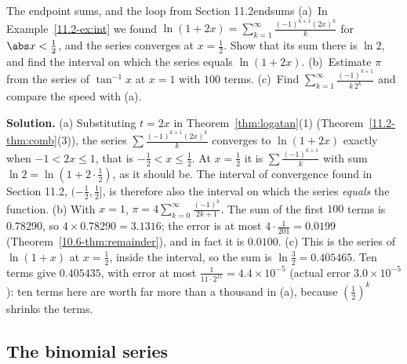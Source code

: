 \documentclass[11pt]{article}
\begin{document}
\begin{exmp}{The endpoint sums, and the loop from Section 11.2}{endsums}
(a)~In Example~\ref{11.2-ex:int} we found $\ln(1+2x)=\sum_{k=1}^\infty\frac{(-1)^{k+1}(2x)^k}k$ for $\abs x<\frac12$, and the series converges at $x=\frac12$. Show that its sum there is $\ln2$, and find the interval on which the series equals $\ln(1+2x)$. (b)~Estimate $\pi$ from the series of $\tan^{-1}x$ at $x=1$ with $100$ terms. (c)~Find $\sum_{k=1}^\infty\frac{(-1)^{k+1}}{k\,2^k}$ and compare the speed with (a).

\textbf{Solution.} (a) Substituting $t=2x$ in Theorem~\ref{thm:logatan}(1) (Theorem~\ref{11.2-thm:comb}(3)), the series $\sum\frac{(-1)^{k+1}(2x)^k}k$ converges to $\ln(1+2x)$ exactly when $-1<2x\le1$, that is $-\frac12<x\le\frac12$. At $x=\frac12$ it is $\sum\frac{(-1)^{k+1}}k$ with sum $\ln2=\ln(1+2\cdot\frac12)$, as it should be. The interval of convergence found in Section 11.2, $(-\frac12,\frac12]$, is therefore also the interval on which the series \emph{equals} the function. (b) With $x=1$, $\pi=4\sum_{k=0}^\infty\frac{(-1)^k}{2k+1}$. The sum of the first $100$ terms is $0.78290$, so $4\times0.78290=3.1316$; the error is at most $4\cdot\frac1{201}=0.0199$ (Theorem~\ref{10.6-thm:remainder}), and in fact it is $0.0100$. (c) This is the series of $\ln(1+x)$ at $x=\frac12$, inside the interval, so the sum is $\ln\frac32=0.405465$. Ten terms give $0.405435$, with error at most $\frac1{11\cdot2^{11}}=4.4\times10^{-5}$ (actual error $3.0\times10^{-5}$): ten terms here are worth far more than a thousand in (a), because $\left(\frac12\right)^k$ shrinks the terms.
\end{exmp}

\subsection*{The binomial series}
\end{document}
